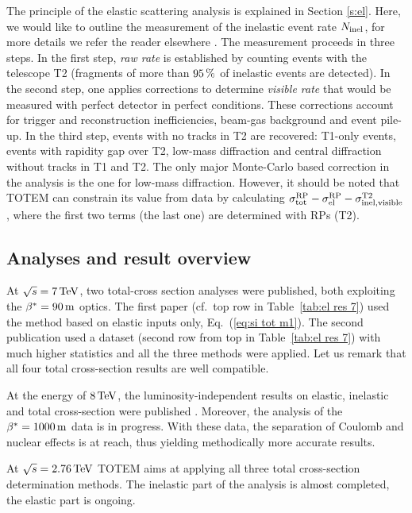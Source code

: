 \documentclass{desyproc}
\def\un#1{\,{\rm #1}}
\begin{document}
The principle of the elastic scattering analysis is explained in Section \ref{s:el}. Here, we would like to outline the measurement of the inelastic event rate $N_{\rm inel}$, for more details we refer the reader elsewhere \cite{si_tot_8,si_inel_7}. The measurement proceeds in three steps. In the first step, {\em raw rate} is established by counting events with the telescope T2 (fragments of more than $95\un{\%}$ of inelastic events are detected). In the second step, one applies corrections to determine {\em visible rate} that would be measured with perfect detector in perfect conditions. These corrections account for trigger and reconstruction inefficiencies, beam-gas background and event pile-up. In the third step, events with no tracks in T2 are recovered:  T1-only events, events with rapidity gap over T2, low-mass diffraction and central diffraction without tracks in T1 and T2. The only major Monte-Carlo based correction in the analysis is the one for low-mass diffraction. However, it should be noted that TOTEM can constrain its value from data by calculating $\sigma_{\rm tot}^{\rm RP} - \sigma_{\rm el}^{\rm RP} - \sigma_{\rm inel, visible}^{\rm T2}$, where the first two terms (the last one) are determined with RPs (T2).


\subsection{Analyses and result overview}

At $\sqrt s =7\un{TeV}$, two total-cross section analyses were published, both exploiting the $\beta^*=90\un{m}$ optics. The first paper \cite{si_el_7_90a} (cf.~top row in Table~\ref{tab:el res 7}) used the method based on elastic inputs only, Eq.~(\ref{eq:si tot m1}). The second publication \cite{si_tot_7} used a dataset (second row from top in Table~\ref{tab:el res 7}) with much higher statistics and all the three methods were applied. Let us remark that all four total cross-section results are well compatible.

At the energy of $8\un{TeV}$, the luminosity-independent results on elastic, inelastic and total cross-section were published \cite{si_tot_8}. Moreover, the analysis of the $\beta^*=1000\un{m}$ data is in progress. With these data, the separation of Coulomb and nuclear effects is at reach, thus yielding methodically more accurate results.

At $\sqrt s = 2.76\un{TeV}$ TOTEM aims at applying all three total cross-section determination methods. The inelastic part of the analysis is almost completed, the elastic part is ongoing.
\end{document}
